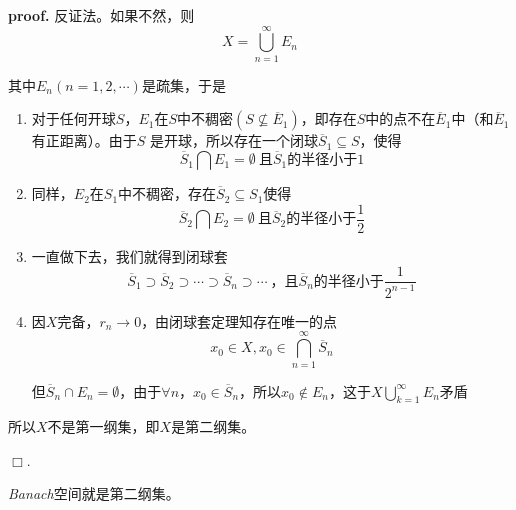 \textbf{proof.}\hspace{0.5em} 反证法。如果不然，则
\begin{equation}
    X=\bigcup^{\infty}_{n=1}E_n
\end{equation}

其中$E_n(n=1,2,\cdots)$是疏集，于是
\begin{enumerate}[itemindent=2em]
    \item 对于任何开球$S$，$E_1$在$S$中不稠密$(S\nsubseteq \overline{E}_1)$，即存在$S$中的点不在$\overline{E}_1$中（和$\overline{E}_1$有正距离）。由于$S$
    是开球，所以存在一个闭球$\overline{S}_1\subseteq S$，使得
    \begin{equation}
        \overline{S}_1\bigcap E_1=\emptyset\ \mbox{且$\overline{S}_1$的半径小于}1
    \end{equation}

    \item 同样，$E_2$在$S_1$中不稠密，存在$\overline{S}_2\subseteq S_1$使得
    \begin{equation}
        \overline{S}_2\bigcap E_2=\emptyset\ \mbox{且$\overline{S}_2$的半径小于}\frac{1}{2}
    \end{equation}

    \item 一直做下去，我们就得到闭球套
    \begin{equation}
        \overline{S}_1\supset  \overline{S}_2\supset \cdots\supset \overline{S}_n\supset\cdots\ \mbox{，且$\overline{S}_n$的半径小于}\frac{1}{2^{n-1}}
    \end{equation}

    \item 因$X$完备，$r_n\rightarrow 0$，由闭球套定理知存在唯一的点
    \begin{equation}
        x_0\in X, x_0\in\bigcap^{\infty}_{n=1}\overline{S}_n
    \end{equation}

    但$\overline{S}_n\cap E_n=\emptyset$，由于$\forall n$，$x_0\in \overline{S}_n$，所以$x_0\notin E_n$，这于$X\bigcup^{\infty}_{k=1}E_n$矛盾
\end{enumerate}

所以$X$不是第一纲集，即$X$是第二纲集。

$\Box$. 

\begin{mdframed}
    \begin{proposition}
        \textsl{Banach}空间就是第二纲集。
    \end{proposition}
\end{mdframed}

